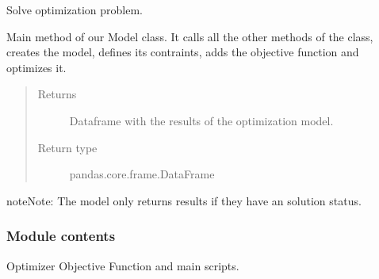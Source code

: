 \documentclass[letterpaper,10pt,english]{sphinxmanual}
\begin{document}
\begin{fulllineitems}
\begin{fulllineitems}
\begin{quote}
\begin{description}
\end{description}\end{quote}

\end{fulllineitems}


\begin{fulllineitems}
\label{\detokenize{source/optimization.model:optimization.model.optimizer.OptimizationModel.solve}}
Solve optimization problem.

Main method of our Model class. It calls all the other methods
of the class, creates the model, defines its contraints, adds the
objective function and optimizes it.
\begin{quote}\begin{description}
\item[{Returns}] \leavevmode
{} \textendash{} Dataframe with the results of the optimization model.

\item[{Return type}] \leavevmode
pandas.core.frame.DataFrame

\end{description}\end{quote}

\begin{sphinxadmonition}{note}{Note:}
The model only returns results if they have an  solution status.
\end{sphinxadmonition}

\end{fulllineitems}


\end{fulllineitems}



\subsubsection{Module contents}
\label{\detokenize{source/optimization.model:module-optimization.model}}\label{\detokenize{source/optimization.model:module-contents}}
Optimizer Objective Function and main scripts.
\end{document}
